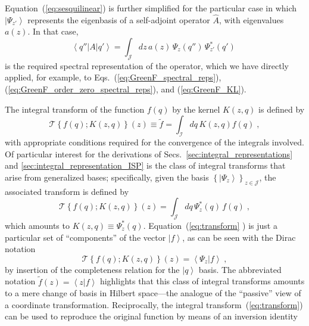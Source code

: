 \documentclass[a4paper,preprint,draft,showpacs,amsmath,amsfonts,amssymb,aps,prd]{revtex4}%
\begin{document}
Equation~(\ref{eq:sesquilinear}) is further simplified for the particular case in which 
$\left| 
\Psi_{z'}
\right\rangle
$
represents the eigenbasis of a self-adjoint operator $\hat{A}$,
with eigenvalues $a(z)$. In that case,
\begin{equation}
\left\langle 
q'' |A| q'
\right\rangle
=
\int_{\mathcal J}
dz
\,
a(z)
\,
\Psi_{z} (q'')
\,
\Psi_{z'}^{*}(q') 
\;
\label{eq:spectral_reps}
\end{equation}
is the required spectral representation of the operator,
which we have directly applied, for example, to 
Eqs.~(\ref{eq:GreenF_spectral_reps}),
(\ref{eq:GreenF_order_zero_spectral_reps}),
and (\ref{eq:GreenF_KL}).

The integral  transform
of the function $f(q)$ by the kernel
$K(z,q)$ is defined by
\begin{equation}
{\mathcal T} 
\left\{
f(q); K(z,q)
\right\} (z)
\equiv 
\tilde{f}
=
\int_{\mathcal I} 
dq 
\,
K(z,q) f(q)
\;  ,
\end{equation}
 with appropriate 
conditions required for the convergence of the integrals
involved. 
Of particular interest for the derivations of Secs.~\ref{sec:integral_representations} and 
\ref{sec:integral_representation_ISP}
is the class of integral transforms
that arise from generalized bases;
specifically,
given the basis
$\left\{  \left| \Psi_{z} \right\rangle
 \right\}_{z \in {\mathcal J}}$,
the associated transform is defined by  
\begin{equation}
{\mathcal T} 
\left\{
f(q); K(z,q)
\right\} (z)
=
\int_{\mathcal J}
dq \,
\Psi_{z}^{*} (q) \,
f(q)
\;  ,
\label{eq:transform}  
\end{equation}
which amounts to
$K(z,q) \equiv \Psi_{z}^{*} (q)$.
Equation~(\ref{eq:transform} ) 
is just a particular set of ``components'' of the vector
$\left| f \right\rangle$, as can be seen with the Dirac 
notation
\begin{equation}
{\mathcal T} 
\left\{
f(q); K(z,q)
\right\} (z)
=
\left\langle \Psi_{z} | f \right\rangle 
\;   ,
\label{eq:generalized_transform}
\end{equation}
by insertion of the completeness relation for the $\left| q \right\rangle$ basis.
The 
abbreviated notation $\tilde{f}(z)=\left\langle z | f \right\rangle $ 
highlights that this class of integral transforms amounts to a mere change of basis in Hilbert
space---the analogue of the ``passive'' view of a coordinate transformation.
Reciprocally,
the integral transform~(\ref{eq:transform}) can be used to reproduce 
the original function by means of an inversion identity
\end{document}
